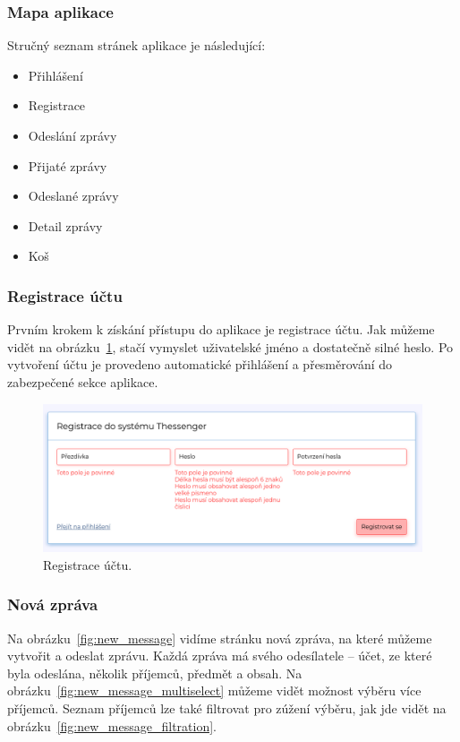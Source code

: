 \documentclass[
  master,
  program=ainf,
  tables=false,
  sourcecodes,
  glossaries,
  index
]{kidiplom}
\begin{document}
\subsubsection{Mapa aplikace}
Stručný seznam stránek aplikace je následující:
\begin{itemize}
  \item Přihlášení
  \item Registrace
  \item Odeslání zprávy
  \item Přijaté zprávy
  \item Odeslané zprávy
  \item Detail zprávy
  \item Koš
\end{itemize}

\subsubsection{Registrace účtu}
Prvním krokem k získání přístupu do aplikace je registrace účtu. Jak můžeme vidět
na obrázku~\ref{fig:registration}, stačí vymyslet
uživatelské jméno a dostatečně silné heslo. Po vytvoření účtu je provedeno
automatické přihlášení a přesměrování do zabezpečené sekce aplikace.

\begin{figure}[H]
  \centering
  \includegraphics[width=\textwidth]{graphics/thessenger_registration.png}
  \caption{Registrace účtu.}
  \label{fig:registration}
\end{figure}

\subsubsection{Nová zpráva}
Na obrázku~\ref{fig:new_message} vidíme stránku nová zpráva, na které můžeme vytvořit a odeslat zprávu.
Každá zpráva má svého odesílatele -- účet, ze které byla odeslána, několik
příjemců, předmět a obsah. 
Na obrázku~\ref{fig:new_message_multiselect} můžeme vidět možnost výběru
více příjemců. Seznam příjemců lze také filtrovat pro zúžení výběru, jak jde vidět na
obrázku~\ref{fig:new_message_filtration}.
\end{document}
